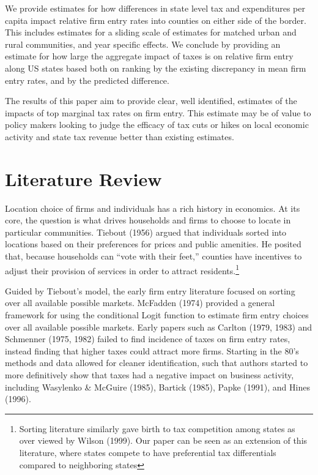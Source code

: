 \documentclass[12pt,a4paper]{article}
\begin{document}
We provide estimates for how differences in state level tax and expenditures per capita impact relative firm entry rates into counties on either side of the border. This includes estimates for a sliding scale of estimates for matched urban and rural communities, and year specific effects. We conclude by providing an estimate for how large the aggregate impact of taxes is on relative firm entry along US states based both on ranking by the existing discrepancy in mean firm entry rates, and by the predicted difference.

The results of this paper aim to provide clear, well identified, estimates of the impacts of top marginal tax rates on firm entry. This estimate may be of value to policy makers looking to judge the efficacy of tax cuts or hikes on local economic activity and state tax revenue better than existing estimates.

\section{Literature Review}

Location choice of firms and individuals has a rich history in economics. At its core, the question is what drives households and firms to choose to locate in particular communities. Tiebout (1956) argued that individuals sorted into locations based on their preferences for prices and public amenities. He posited that, because households can “vote with their feet,” counties have incentives to adjust their provision of services in order to attract residents.\footnote{Sorting literature similarly gave birth to tax competition among states as over viewed by Wilson (1999). Our paper can be seen as an extension of this literature, where states compete to have preferential tax differentials compared to neighboring states}

Guided by Tiebout’s model, the early firm entry literature focused on sorting over all available possible markets.  McFadden (1974) provided a general framework for using the conditional Logit function to estimate firm entry choices over all available possible markets. Early papers such as Carlton (1979, 1983) and Schmenner (1975, 1982) failed to find incidence of taxes on firm entry rates, instead finding that higher taxes could attract more firms. Starting in the 80's methods and data allowed for cleaner identification, such that authors started to more definitively show that taxes had a negative impact on business activity, including Wasylenko \& McGuire (1985), Bartick (1985), Papke (1991), and Hines (1996).
\end{document}

